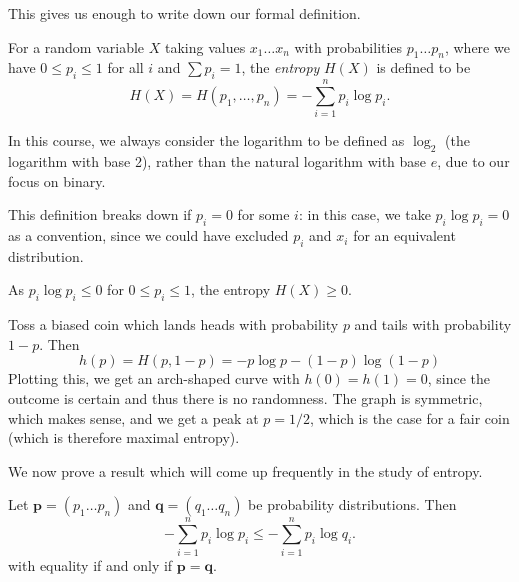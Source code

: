 \documentclass{article}
\begin{document}
This gives us enough to write down our formal definition.

\begin{definition}[Entropy]
	\label{entropy}
    For a random variable $X$
    taking values $x_1 \dots x_n$
    with probabilities $p_1 \dots p_n$,
    where we have $0 \leq p_i \leq 1$ for all $i$
    and $\sum p_i = 1$,
    the \textit{entropy} $H(X)$ is defined to be
    \[
	H(X) = H(p_1, \dots, p_n) =
	-\sum_{i=1}^n p_i \log p_i.
	\]
\end{definition}

\begin{note}
	In this course, we always consider the logarithm to be defined as $\log_2$
	(the logarithm with base 2),
	rather than the natural logarithm with base $e$,
	due to our focus on binary.
\end{note}

\begin{note}
	This definition breaks down if $p_i = 0$ for some $i$:
	in this case, we take $p_i \log p_i = 0$ as a convention,
	since we could have excluded $p_i$ and $x_i$ for an equivalent distribution.
\end{note}

\begin{corollary}
    As $p_i \log p_i \leq 0$ for $0 \leq p_i \leq 1$,
    the entropy $H(X) \geq 0$.
\end{corollary}

\begin{example}
	\label{entropy-of-single-variable}
    Toss a biased coin
    which lands heads with probability $p$
    and tails with probability $1-p$.
    Then
    \[
	h(p) = H(p, 1-p) = -p \log p - (1-p) \log (1-p)
	\]
	Plotting this, we get an arch-shaped curve with $h(0) = h(1) = 0$,
	since the outcome is certain and thus there is no randomness.
	The graph is symmetric, which makes sense,
	and we get a peak at $p = 1/2$,
	which is the case for a fair coin
	(which is therefore maximal entropy).
\end{example}

We now prove a result which will come up frequently in the study of entropy.

\begin{theorem}
	\label{gibbs-inequality}
    Let $\mathbf p = (p_1 \dots p_n)$
    and $\mathbf q = (q_1 \dots q_n)$
    be probability distributions. Then
    \[
	- \sum_{i=1}^n p_i \log p_i \leq
	- \sum_{i=1}^n p_i \log q_i.
	\]
	with equality if and only if $\mathbf p = \mathbf q$.
\end{theorem}
\end{document}
